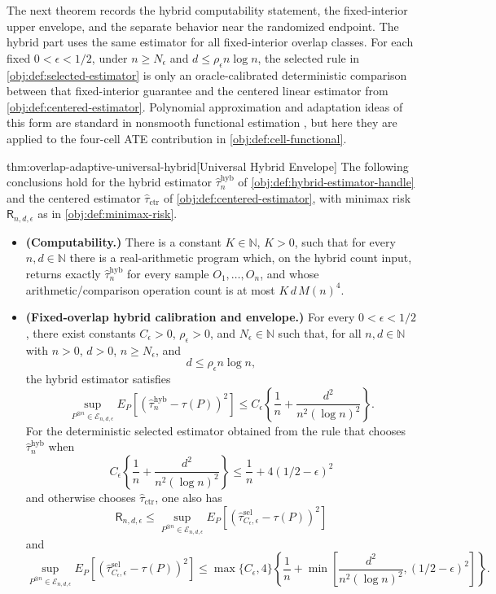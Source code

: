 The next theorem records the hybrid computability statement, the fixed-interior upper envelope, and the separate behavior near the randomized endpoint. The hybrid part uses the same estimator for all fixed-interior overlap classes. For each fixed \(0<\epsilon<1/2\), under \(n\ge N_\epsilon\) and \(d\le \rho_\epsilon n\log n\), the selected rule in \cref{obj:def:selected-estimator} is only an oracle-calibrated deterministic comparison between that fixed-interior guarantee and the centered linear estimator from \cref{obj:def:centered-estimator}. Polynomial approximation and adaptation ideas of this form are standard in nonsmooth functional estimation \citep{CaiLow2011, Lepski1999, JiaoVenkatHanWeissman2015}, but here they are applied to the four-cell ATE contribution in \cref{obj:def:cell-functional}.

\begin{theoremv}{thm:overlap-adaptive-universal-hybrid}[Universal Hybrid Envelope]
The following conclusions hold for the hybrid estimator \(\widehat\tau_n^{\mathrm{hyb}}\) of \cref{obj:def:hybrid-estimator-handle} and the centered estimator \(\widehat\tau_{\mathrm{ctr}}\) of \cref{obj:def:centered-estimator}, with minimax risk \(\mathsf R_{n,d,\epsilon}\) as in \cref{obj:def:minimax-risk}.
\begin{itemize}
\item \textbf{(Computability.)} There is a constant \(K\in\mathbb N\), \(K>0\), such that for every \(n,d\in\mathbb N\) there is a real-arithmetic program which, on the hybrid count input, returns exactly \(\widehat\tau_n^{\mathrm{hyb}}\) for every sample \(O_1,\ldots,O_n\), and whose arithmetic/comparison operation count is at most \(K\,d\,M(n)^4\).

\item \textbf{(Fixed-overlap hybrid calibration and envelope.)} For every \(0<\epsilon<1/2\), there exist constants \(C_\epsilon>0\), \(\rho_\epsilon>0\), and \(N_\epsilon\in\mathbb N\) such that, for all \(n,d\in\mathbb N\) with \(n>0\), \(d>0\), \(n\ge N_\epsilon\), and
\[
d\le \rho_\epsilon n\log n,
\]
the hybrid estimator satisfies
\[
\sup_{P^{\otimes n}\in\mathcal E_{n,d,\epsilon}}
E_P\!\left[(\widehat\tau_n^{\mathrm{hyb}}-\tau(P))^2\right]
\le
C_\epsilon\left\{\frac1n+\frac{d^2}{n^2(\log n)^2}\right\}.
\]
For the deterministic selected estimator obtained from the rule that chooses \(\widehat\tau_n^{\mathrm{hyb}}\) when
\[
C_\epsilon\left\{\frac1n+\frac{d^2}{n^2(\log n)^2}\right\}
\le
\frac1n+4(1/2-\epsilon)^2
\]
and otherwise chooses \(\widehat\tau_{\mathrm{ctr}}\), one also has
\[
\mathsf R_{n,d,\epsilon}
\le
\sup_{P^{\otimes n}\in\mathcal E_{n,d,\epsilon}}
E_P\!\left[(\widehat\tau^{\mathrm{sel}}_{C_\epsilon,\epsilon}-\tau(P))^2\right]
\]
and
\[
\sup_{P^{\otimes n}\in\mathcal E_{n,d,\epsilon}}
E_P\!\left[(\widehat\tau^{\mathrm{sel}}_{C_\epsilon,\epsilon}-\tau(P))^2\right]
\le
\max\{C_\epsilon,4\}
\left\{
\frac1n+
\min\left[
\frac{d^2}{n^2(\log n)^2},(1/2-\epsilon)^2
\right]
\right\}.
\]


\end{itemize}
\end{theoremv}
